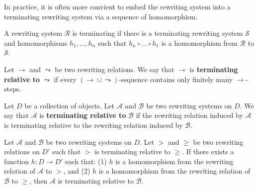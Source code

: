     In practice, it is often more convient to embed the rewriting system into a terminating rewriting system via a sequence of homomorphism.
    \begin{corollary}
      A rewriting system $\mathcal{R}$ is terminating if there is a terminating rewriting system $\mathcal{S}$ and homomorphisms $h_1,\ldots, h_n$ such that $h_n \circ \ldots \circ h_1$ is a homomorphism from $\mathcal{R}$ to $\mathcal{S}$.
    \end{corollary}
    
    \begin{definition}
        \label{def:rewriting_relation:relative_termination}
        Let \( \mathop{\to} \) and \( \leadsto \) be two rewriting relations. We say that \(\to\) is \textbf{terminating relative to} \(\leadsto\) if every \( \left( \mathop{\to} \mathop{\cup} \leadsto \right) \)-sequence contains only finitely many \(\to\)-steps.
    \end{definition}
    
    \begin{definition}
        \label{def:rewriting_system:relative_termination}
        Let $D$ be a collection of objects.
        Let \( \mathcal{A} \) and \( \mathcal{B} \) be two rewriting systems on $D$. We say that \(\mathcal{A}\) is \textbf{terminating relative to} \(\mathcal{B}\) if the rewriting relation induced by \(\mathcal{A}\) is terminating relative to the rewriting relation induced by \(\mathcal{B}\).
    \end{definition}
    
    \begin{definition}
        \label{def:rewriting_system:proving_relative_termination}
        Let \( \mathcal{A} \) and \( \mathcal{B} \) be two rewriting systems on $D$. Let $>$ and $\geq$ be two rewriting relations on $D'$ such that $>$ is terminating relative to $\geq$. If there exists a function $h : D \mathop{\to} D'$ such that: (1) $h$ is a homomorphism from the rewriting relation of \(\mathcal{A}\) to $>$, and (2) $h$ is a homomorphism from the rewriting relation of \(\mathcal{B}\) to $\geq$, then \(\mathcal{A}\) is terminating relative to \(\mathcal{B}\).
    \end{definition}
    
